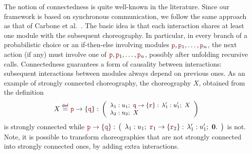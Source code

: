 The notion of connectedness is quite well-known in the
literature. Since our framework is based on synchronous communication,
we follow the same approach as that of Carbone et
al.~\cite{CHY12}. The basic idea is that each interaction shares at
least one module with the subsequent choreography. In particular, in
every branch of a probabilistic choice or an if-then-else involving
modules $\nr, \nr_1, \ldots, \nr_n$, the next action (if any) must
involve one of $\nr, \nr_1, \ldots, \nr_n$, possibly after unfolding
recursive calls. Connectedness guarantees a form of causality between
interactions: subsequent interactions between modules always depend on
previous ones.
As an example of strongly connected choreography, the choreography
$X$, obtained from the definition
\begin{displaymath}\small
  X\defrec
  \interactBase{\nr}{\nrr}:\,
  \left(
    \begin{array}{l}
      \lambda_1: u_1;\ \interactBase{\nrr}{\nrrr}:\, \lambda_1':u_1';\ X    \\
      \lambda_2: u_2;\ X
    \end{array}
  \right)
\end{displaymath}
is strongly connected while 
$
\interactBase{\nr}{\nrr}:\,
\left(
  \begin{array}{l}
    \lambda_1: u_1;\ \interactBase{\nrrr_1}{\nrrr_2}:\, \lambda_1':u_1';\ \CEnd.
  \end{array}
\right) $ is not. Note, it is possible to transform choreographies
that are not strongly connected into strongly connected ones, by
adding extra interactions.


\smallskip

